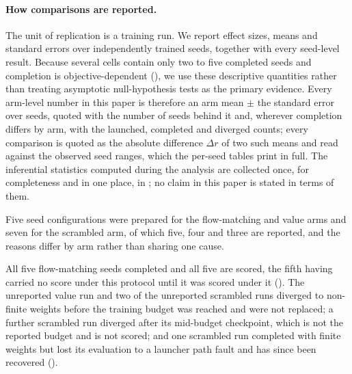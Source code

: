 \paragraph{How comparisons are reported.} The unit of replication is a training run.
We report effect sizes, means and standard errors over independently trained seeds,
together with every seed-level result. Because several cells contain only two to five
completed seeds and completion is objective-dependent (), we use
these descriptive quantities rather than treating asymptotic null-hypothesis tests as
the primary evidence. Every arm-level number in this paper is therefore an arm mean
$\pm$ the standard error over seeds, quoted with the number of seeds behind it and,
wherever completion differs by arm, with the launched, completed and diverged counts;
every comparison is quoted as the absolute difference $\Delta r$ of two such means and
read against the observed seed ranges, which the per-seed tables print in full. The
inferential statistics computed during the analysis are collected once, for
completeness and in one place, in ; no claim in this paper is
stated in terms of them.

Five seed configurations were prepared for the flow-matching and
value arms and seven for the scrambled arm, of which five, four and three are
reported, and the reasons differ by arm rather than sharing one cause.

All five flow-matching seeds completed and all five are scored, the fifth having
carried no score under this protocol until it was scored under it ().
The unreported value run and two of the unreported scrambled runs diverged to
non-finite weights before the training budget was reached and were not replaced; a
further scrambled run diverged after its mid-budget checkpoint, which is not the
reported budget and is not scored; and one scrambled run completed with finite weights
but lost its evaluation to a launcher path fault and has since been recovered
().

